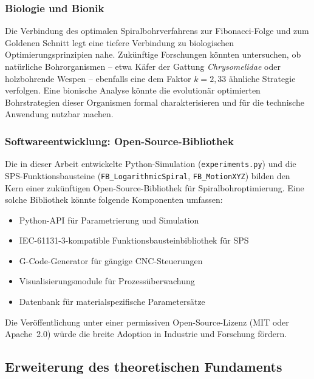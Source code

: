 ﻿\documentclass[12pt,a4paper]{article}
\begin{document}
\subsubsection{Biologie und Bionik}

Die Verbindung des optimalen Spiralbohrverfahrens zur Fibonacci-Folge und zum Goldenen Schnitt legt eine tiefere Verbindung zu biologischen Optimierungsprinzipien nahe. Zukünftige Forschungen könnten untersuchen, ob natürliche Bohrorganismen -- etwa Käfer der Gattung \textit{Chrysomelidae} oder holzbohrende Wespen -- ebenfalls eine dem Faktor $k = 2{,}33$ ähnliche Strategie verfolgen. Eine bionische Analyse könnte die evolutionär optimierten Bohrstrategien dieser Organismen formal charakterisieren und für die technische Anwendung nutzbar machen.

\subsubsection{Softwareentwicklung: Open-Source-Bibliothek}

Die in dieser Arbeit entwickelte Python-Simulation (\texttt{experiments.py}) und die SPS-Funktionsbausteine (\texttt{FB\_\allowbreak{}Logarithmic\allowbreak{}Spiral}, \texttt{FB\_\allowbreak{}MotionXYZ}) bilden den Kern einer zukünftigen Open-Source-Bibliothek für Spiralbohroptimierung. Eine solche Bibliothek könnte folgende Komponenten umfassen:
\begin{itemize}
    \item Python-API für Parametrierung und Simulation
    \item IEC-61131-3-kompatible Funktionsbausteinbibliothek für SPS
    \item G-Code-Generator für gängige CNC-Steuerungen
    \item Visualisierungsmodule für Prozessüberwachung
    \item Datenbank für materialspezifische Parametersätze
\end{itemize}
Die Veröffentlichung unter einer permissiven Open-Source-Lizenz (MIT oder Apache~2.0) würde die breite Adoption in Industrie und Forschung fördern.

\subsection{Erweiterung des theoretischen Fundaments}
\end{document}
